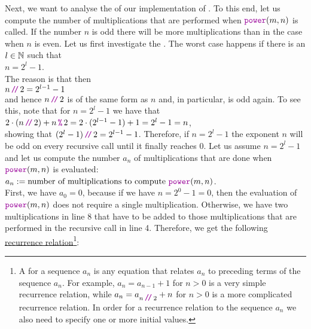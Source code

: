 Next, we want to analyse the  of our implementation of .
To this end, let us compute the number of multiplications that are performed when
$\mytt{power}(m,n)$ is called.  If the number $n$ is odd there will be more multiplications than
in the case when $n$ is even.  Let us first investigate the .  
The worst case happens if there is an $l\in {\mathbb N}$ such that 
\\[0.2cm]
\hspace*{1.3cm}
$n = 2^l - 1$. 
\\[0.2cm]
The reason is that then
\\[0.2cm]
\hspace*{1.3cm} $n \dv 2 = 2^{l-1} - 1$
\\[0.2cm]
and hence $n \dv 2$ is of the same form as $n$ and, in particular, is odd again.  To see this, note that
for $n = 2^l - 1$ we have that
\\[0.2cm]
\hspace*{1.3cm}
$2 \cdot(n \dv 2) + n \,\mytt{\symbol{37}}\, 2 = 2 \cdot (2^{l-1} - 1) + 1 = 2^l - 1 = n$,
\\[0.2cm]
showing that $(2^l -1 ) \dv 2 = 2^{l-1} -1$.
Therefore, if $n = 2^l - 1$ the exponent $n$ will be odd on every recursive call until it finally reaches $0$.
Let us assume $n = 2^l - 1$ and let us compute the number $a_n$ of multiplications that
are done when $\mytt{power}(m,n)$ is evaluated:
\\[0.2cm]
\hspace*{1.3cm}
$a_n := \mbox{number of multiplications to compute \mytt{power}}(m, n)$.
\\[0.2cm]
First, we have $a_0 = 0$, because if we have $n = 2^0 - 1 = 0$, then the evaluation of 
$\mytt{power}(m, n)$ does not require a single multiplication.
Otherwise, we have two multiplications in line 8 that have to be added to those multiplications
that are performed in the recursive call in line 4.  Therefore, we get the following
\href{http://en.wikipedia.org/wiki/Recurrence_relation}{recurrence relation}\footnote{
  A   for a sequence $a_n$ is any equation that relates
  $a_n$ to preceding terms of the sequence $a_n$.  For example, $a_n = a_{n-1} + 1$ for $n > 0$ is a very
  simple recurrence relation, while $a_n = a_{n \dv 2} + n$ for $n > 0$ is a more complicated recurrence
  relation.  In order for a recurrence relation to  the sequence $a_n$ we also need to specify one
  or more initial values.  
}:
\\[0.2cm]
